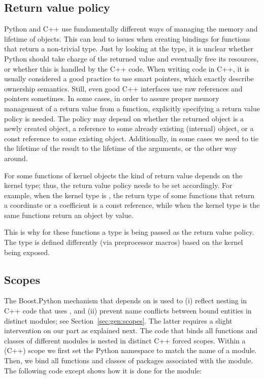 \subsection{Return value policy}
\label{sec:code:rvp}
Python and C++ use fundamentally different ways of managing the memory
and lifetime of objects. This can lead to issues when creating
bindings for functions that return a non-trivial type. Just by looking
at the type, it is unclear whether Python should take charge of the
returned value and eventually free its resources, or whether this is
handled by the C++ code. When writing code in C++, it is usually
considered a good practice to use smart pointers, which exactly
describe ownership semantics. Still, even good C++ interfaces use raw
references and pointers sometimes. In some cases, in order to assure
proper memory management of a return value from a function, explicitly
specifying a return value policy is needed. The policy may depend on
whether the returned object is a newly created object, a reference to
some already existing (internal) object, or a const reference to some
existing object. Additionally, in some cases we need to tie the
lifetime of the result to the lifetime of the arguments, or the other
way around.

For some functions of kernel objects the kind of return value depends
on the kernel type; thus, the return value policy needs to be set
accordingly. For example, when the kernel type is
, the
return type of some functions that return a coordinate or a
coefficient is a const reference, while when the kernel type is
 the same
functions return an object by value.

This is why for these functions a
 type is being passed as the
return value policy. The type is defined differently (via preprocessor
macros) based on the kernel being exposed.

\subsection{Scopes}
\label{sec:code:scopes}
The Boost.Python mechanism that depends on  is
used to (i) reflect nesting in C++ code that uses \cgal, and (ii)
prevent name conflicts between bound entities in distinct modules; see
Section~\ref{sec:gen:scopes}. The latter requires a slight
intervention on our part as explained next. The code that binds all
functions and classes of different modules is nested in distinct C++
forced scopes. Within a (C++) scope we first set the Python namespace
to match the name of a module. Then, we bind all functions and classes
of \cgal{} packages associated with the module. The following code
except shows how it is done for the \iiDandiiiDGeometryKernelPackage{}
module:

